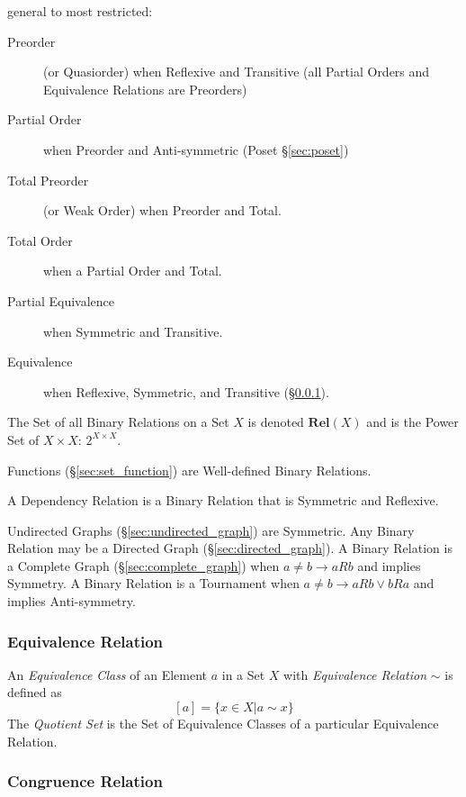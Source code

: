 general to most restricted:
\begin{description}
\item[Preorder] (or Quasiorder) when Reflexive and Transitive (all
  Partial Orders and Equivalence Relations are Preorders)
\item[Partial Order] when Preorder and Anti-symmetric (Poset
  \S\ref{sec:poset})
\item[Total Preorder] (or Weak Order) when Preorder and Total.
\item[Total Order] when a Partial Order and Total.
\item[Partial Equivalence] when Symmetric and Transitive.
\item[Equivalence] when Reflexive, Symmetric, and Transitive
  (\S\ref{sec:equivalence_relation}).
\end{description}

The Set of all Binary Relations on a Set $X$ is denoted
$\mathbf{Rel}(X)$ and is the Power Set of $X \times X$: $2^{X \times
  X}$.

Functions (\S\ref{sec:set_function}) are Well-defined Binary Relations.

A Dependency Relation is a Binary Relation that is Symmetric and
Reflexive.

Undirected Graphs (\S\ref{sec:undirected_graph}) are Symmetric.
Any Binary Relation may be a Directed Graph
(\S\ref{sec:directed_graph}). A Binary Relation is a Complete Graph
(\S\ref{sec:complete_graph}) when $a \neq b \rightarrow aRb$ and
implies Symmetry. A Binary Relation is a Tournament when $a \neq b
\rightarrow aRb \vee bRa$ and implies Anti-symmetry.



\subsubsection{Equivalence Relation}\label{sec:equivalence_relation}

An \emph{Equivalence Class} of an Element $a$ in a Set $X$ with
\emph{Equivalence Relation} $\sim$ is defined as
\[
    [a] = \{x \in X | a \sim x\}
\]
The \emph{Quotient Set} is the Set of Equivalence Classes of a
particular Equivalence Relation.



\subsubsection{Congruence Relation}\label{sec:congruence_relation}



